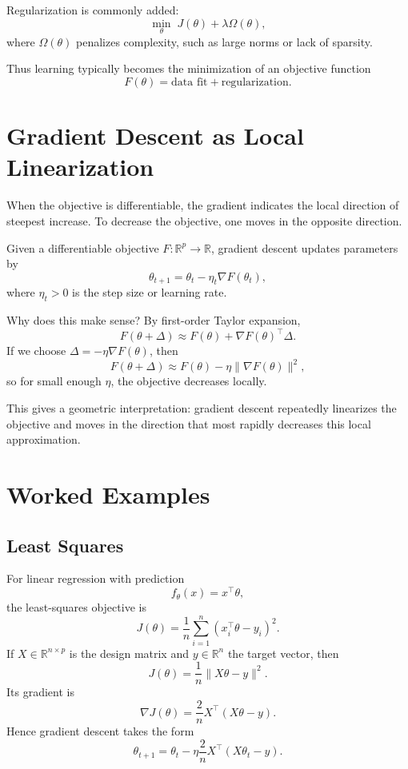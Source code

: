 Regularization is commonly added:
\[
\min_{\theta} \; J(\theta)+\lambda \Omega(\theta),
\]
where $\Omega(\theta)$ penalizes complexity, such as large norms or lack of sparsity.

Thus learning typically becomes the minimization of an objective function
\[
F(\theta)=\text{data fit}+\text{regularization}.
\]

\section{Gradient Descent as Local Linearization}

When the objective is differentiable, the gradient indicates the local direction of steepest increase. To decrease the objective, one moves in the opposite direction.

\begin{definition}
Given a differentiable objective $F:\mathbb{R}^p\to\mathbb{R}$, gradient descent updates parameters by
\[
\theta_{t+1}=\theta_t-\eta_t \nabla F(\theta_t),
\]
where $\eta_t>0$ is the step size or learning rate.
\end{definition}

Why does this make sense? By first-order Taylor expansion,
\[
F(\theta+\Delta)\approx F(\theta)+\nabla F(\theta)^\top \Delta.
\]
If we choose $\Delta=-\eta \nabla F(\theta)$, then
\[
F(\theta+\Delta)\approx F(\theta)-\eta \|\nabla F(\theta)\|^2,
\]
so for small enough $\eta$, the objective decreases locally.

This gives a geometric interpretation: gradient descent repeatedly linearizes the objective and moves in the direction that most rapidly decreases this local approximation.

\section{Worked Examples}

\subsection{Least Squares}

For linear regression with prediction
\[
f_\theta(x)=x^\top \theta,
\]
the least-squares objective is
\[
J(\theta)=\frac1n\sum_{i=1}^n (x_i^\top \theta-y_i)^2.
\]
If $X\in\mathbb{R}^{n\times p}$ is the design matrix and $y\in\mathbb{R}^n$ the target vector, then
\[
J(\theta)=\frac1n \|X\theta-y\|^2.
\]
Its gradient is
\[
\nabla J(\theta)=\frac{2}{n}X^\top (X\theta-y).
\]
Hence gradient descent takes the form
\[
\theta_{t+1}=\theta_t-\eta \frac{2}{n}X^\top (X\theta_t-y).
\]

